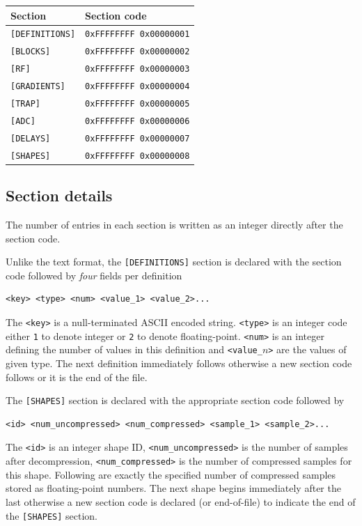 \documentclass{article}
\begin{document}
\begin{center}
\begin{tabular}{ll}
\toprule
Section & Section code \\
\midrule
\verb.[DEFINITIONS]. & \verb.0xFFFFFFFF 0x00000001. \\
\verb.[BLOCKS]. & \verb.0xFFFFFFFF 0x00000002. \\
\verb.[RF]. & \verb.0xFFFFFFFF 0x00000003. \\
\verb.[GRADIENTS]. & \verb.0xFFFFFFFF 0x00000004. \\
\verb.[TRAP]. & \verb.0xFFFFFFFF 0x00000005. \\
\verb.[ADC]. & \verb.0xFFFFFFFF 0x00000006. \\
\verb.[DELAYS]. & \verb.0xFFFFFFFF 0x00000007. \\
\verb.[SHAPES]. & \verb.0xFFFFFFFF 0x00000008. \\
\bottomrule
\end{tabular}
\end{center}

\subsection{Section details}

The number of entries in each section is written as an integer directly after the section code.

Unlike the text format, the \verb.[DEFINITIONS]. section is declared with the section code followed by \emph{four} fields per definition
\begin{lstlisting}
<key> <type> <num> <value_1> <value_2>...
\end{lstlisting}
The \verb.<key>. is a null-terminated ASCII encoded string. \verb.<type>. is an integer code either \verb.1. to denote integer or \verb.2. to denote floating-point. \verb.<num>. is an integer defining the number of values in this definition and \verb.<value_.$n$\verb.>. are the values of given type. The next definition immediately follows otherwise a new section code follows or it is the end of the file.

The \verb.[SHAPES]. section is declared with the appropriate section code followed by
\begin{lstlisting}
<id> <num_uncompressed> <num_compressed> <sample_1> <sample_2>...
\end{lstlisting}
The \verb.<id>. is an integer shape ID, \verb.<num_uncompressed>. is the number of samples after decompression, \verb.<num_compressed>. is the number of compressed samples for this shape. Following are exactly the specified number of compressed samples stored as floating-point numbers. The next shape begins immediately after the last otherwise a new section code is declared (or end-of-file) to indicate the end of the \verb.[SHAPES]. section.
\end{document}

